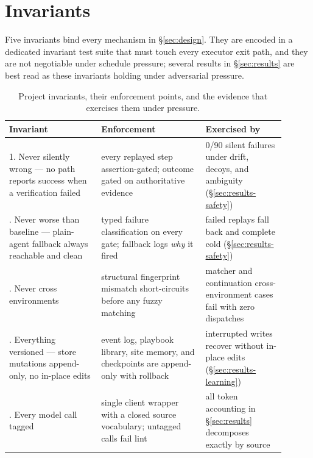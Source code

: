 \documentclass{article} %
\begin{document}
\section{Invariants}
\label{sec:invariants}

Five invariants bind every mechanism in \S\ref{sec:design}. They are encoded in a
dedicated invariant test suite that must touch every executor exit path, and they are
not negotiable under schedule pressure; several results in \S\ref{sec:results} are best
read as these invariants holding under adversarial pressure.

\begin{table}[h]
\caption{Project invariants, their enforcement points, and the evidence that exercises
them under pressure.}
\label{tab:invariants}
\begin{center}
\small
\begin{tabular}{p{0.30\linewidth}p{0.34\linewidth}p{0.26\linewidth}}
\toprule
\textbf{Invariant} & \textbf{Enforcement} & \textbf{Exercised by} \\
\midrule
1. Never silently wrong --- no path reports success when a verification failed &
every replayed step assertion-gated; outcome gated on authoritative evidence &
0/90 silent failures under drift, decoys, and ambiguity (\S\ref{sec:results-safety}) \\
\addlinespace
2. Never worse than baseline --- plain-agent fallback always reachable and clean &
typed failure classification on every gate; fallback logs \emph{why} it fired &
failed replays fall back and complete cold (\S\ref{sec:results-safety}) \\
\addlinespace
3. Never cross environments &
structural fingerprint mismatch short-circuits before any fuzzy matching &
matcher and continuation cross-environment cases fail with zero dispatches \\
\addlinespace
4. Everything versioned --- store mutations append-only, no in-place edits &
event log, playbook library, site memory, and checkpoints are append-only with rollback &
interrupted writes recover without in-place edits (\S\ref{sec:results-learning}) \\
\addlinespace
5. Every model call tagged &
single client wrapper with a closed source vocabulary; untagged calls fail lint &
all token accounting in \S\ref{sec:results} decomposes exactly by source \\
\bottomrule
\end{tabular}
\end{center}
\end{table}
\end{document}

